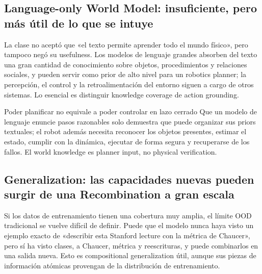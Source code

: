 \documentclass[a4paper]{article}
\begin{document}
\subsection{Language-only World Model: insuficiente, pero más útil de lo que se intuye}

La clase no aceptó que «el texto permite aprender todo el mundo físico», pero tampoco negó su usefulness. Los modelos de lenguaje grandes absorben del texto una gran cantidad de conocimiento sobre objetos, procedimientos y relaciones sociales, y pueden servir como prior de alto nivel para un robotics planner; la percepción, el control y la retroalimentación del entorno siguen a cargo de otros sistemas. Lo esencial es distinguir knowledge coverage de action grounding.

\begin{warningbox}{Poder planificar no equivale a poder controlar en lazo cerrado}
Que un modelo de lenguaje enuncie pasos razonables solo demuestra que puede organizar sus priors textuales; el robot además necesita reconocer los objetos presentes, estimar el estado, cumplir con la dinámica, ejecutar de forma segura y recuperarse de los fallos. El world knowledge es planner input, no physical verification.
\end{warningbox}


\subsection{Generalization: las capacidades nuevas pueden surgir de una Recombination a gran escala}

Si los datos de entrenamiento tienen una cobertura muy amplia, el límite OOD tradicional se vuelve difícil de definir. Puede que el modelo nunca haya visto un ejemplo exacto de «describir esta Stanford lecture con la métrica de Chaucer», pero sí ha visto clases, a Chaucer, métrica y reescrituras, y puede combinarlos en una salida nueva. Esto es compositional generalization útil, aunque sus piezas de información atómicas provengan de la distribución de entrenamiento.
\end{document}
